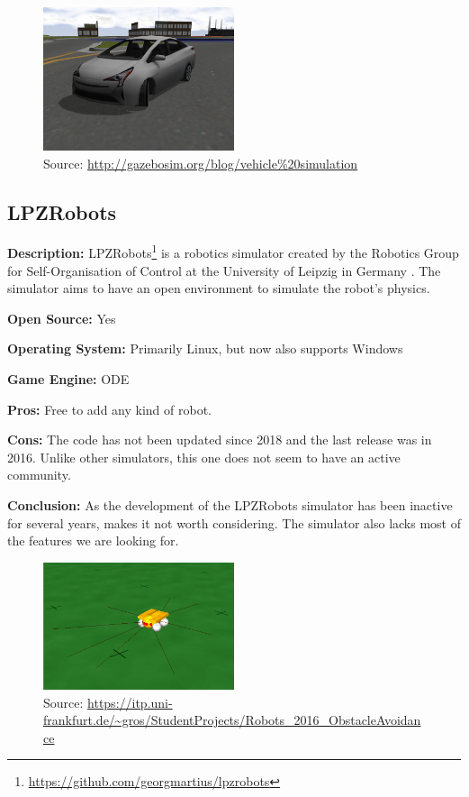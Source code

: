\begin{figure}[H]
    \centering
    \includegraphics[width=0.5\textwidth]{Simulators/gazebo.png}
    \caption{Source: \url{http://gazebosim.org/blog/vehicle\%20simulation}}
\end{figure}


\subsection{LPZRobots}
\textbf{Description:} LPZRobots\footnote{\url{https://github.com/georgmartius/lpzrobots}} is a robotics simulator created by the Robotics Group for Self-Organisation of Control at the University of Leipzig in Germany \cite{LPZRobots_Website, LPZRobots_book}. The simulator aims to have an open environment to simulate the robot's physics. 

\textbf{Open Source:} Yes

\textbf{Operating System:} Primarily Linux, but now also supports Windows

\textbf{Game Engine:} ODE

\textbf{Pros:} Free to add any kind of robot.

\textbf{Cons:} The code has not been updated since 2018 and the last release was in 2016. Unlike other simulators, this one does not seem to have an active community. 

\textbf{Conclusion:} As the development of the LPZRobots simulator has been inactive for several years, makes it not worth considering. The simulator also lacks most of the features we are looking for. 

\begin{figure}[H]
    \centering
    \includegraphics[width=0.5\textwidth]{Simulators/LPZRobots.png}
    \caption{Source: \url{https://itp.uni-frankfurt.de/~gros/StudentProjects/Robots\_2016\_ObstacleAvoidance}}
\end{figure}


